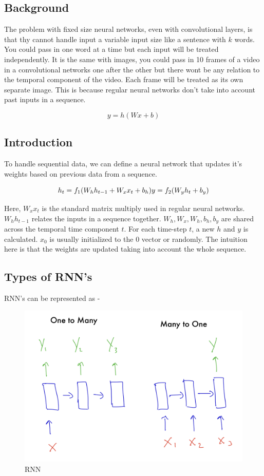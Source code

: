 \documentclass[
]{article}
\begin{document}
\subsection{Background}\label{background}

The problem with fixed size neural networks, even with convolutional layers, is that thy cannot handle input a variable input size like a sentence with \(k\) words. You could pass in one word at a time but each input will be treated independently. It is the same with images, you could pass in 10 frames of a video in a convolutional networks one after the other but there wont be any relation to the temporal component of the video. Each frame will be treated as its own separate image. This is because regular neural networks don't take into account past inputs in a sequence.

\[
y = h(Wx+b)
\]

\subsection{Introduction}\label{introduction-1}

To handle sequential data, we can define a neural network that updates it's weights based on previous data from a sequence.

\[
h_t = f_1(W_{h} h_{t-1} + W_{x} x_{t} + b_h) \\
y = f_2(W_{y} h_{t} + b_y)
\]

Here, \(W_{x} x_{t}\) is the standard matrix multiply used in regular neural networks. \(W_hh_{t-1}\) relates the inputs in a sequence together. \(W_{h}, W_{x}, W_{h}, b_h, b_y\) are shared across the temporal time component \(t\). For each time-step \(t\), a new \(h\) and \(y\) is calculated. \(x_0\) is usually initialized to the \(0\) vector or randomly. The intuition here is that the weights are updated taking into account the whole sequence.

\subsection{Types of RNN's}\label{types-of-rnns}

RNN's can be represented as -

\begin{figure}
\centering
\includegraphics{images/IMG_0012.jpg}
\caption{RNN}
\end{figure}
\end{document}

